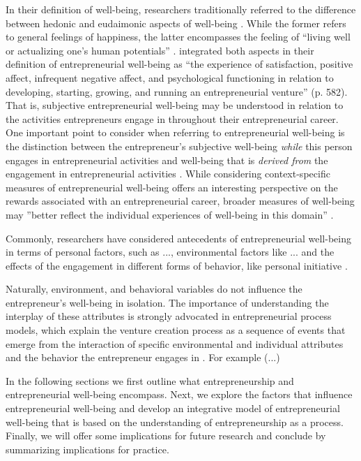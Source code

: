 \documentclass[a4paper,man,natbib]{apa6}
\begin{document}
In their definition of well-being, researchers traditionally referred to the difference between hedonic and eudaimonic aspects of well-being \citep{Deci2008}. While the former refers to general feelings of happiness, the latter encompasses the feeling of “living well or actualizing one’s human potentials” \cite[p.~2]{Deci2008}. \cite{Wiklund2019} integrated both aspects in their definition of entrepreneurial well-being as “the experience of satisfaction, positive affect, infrequent negative affect, and psychological functioning in relation to developing, starting, growing, and running an entrepreneurial venture” (p. 582). That is, subjective entrepreneurial well-being may be understood in relation to the activities entrepreneurs engage in throughout their entrepreneurial career. One important point to consider when referring to entrepreneurial well-being is the distinction between the entrepreneur's subjective well-being \textit{while} this person engages in entrepreneurial activities and well-being that is \textit{derived from} the engagement in entrepreneurial activities \citep{Wiklund2019}. While considering context-specific measures of entrepreneurial well-being offers an interesting perspective on the rewards associated with an entrepreneurial career, broader measures of well-being may ''better reflect the individual experiences of well-being in this domain'' \cite[p.582] {Wiklund2019}. \par
Commonly, researchers have considered antecedents of entrepreneurial well-being in terms of personal factors, such as ..., environmental factors like ... and the effects of the engagement in different forms of behavior, like personal initiative \citep{Hahn2012}. \par 
Naturally, environment, and behavioral variables do not influence the entrepreneur's well-being in isolation. The importance of understanding the interplay of these attributes is strongly advocated in entrepreneurial process models, which explain the venture creation process as a sequence of events that emerge from the interaction of specific environmental and individual attributes and the behavior the entrepreneur engages in \cite{Moroz2012}. For example (...) \par
In the following sections we first outline what entrepreneurship and entrepreneurial well-being encompass. Next, we explore the factors that influence entrepreneurial well-being and develop an integrative model of entrepreneurial well-being that is based on the understanding of entrepreneurship as a process. Finally, we will offer some implications for future research and conclude by summarizing implications for practice.
\end{document}

